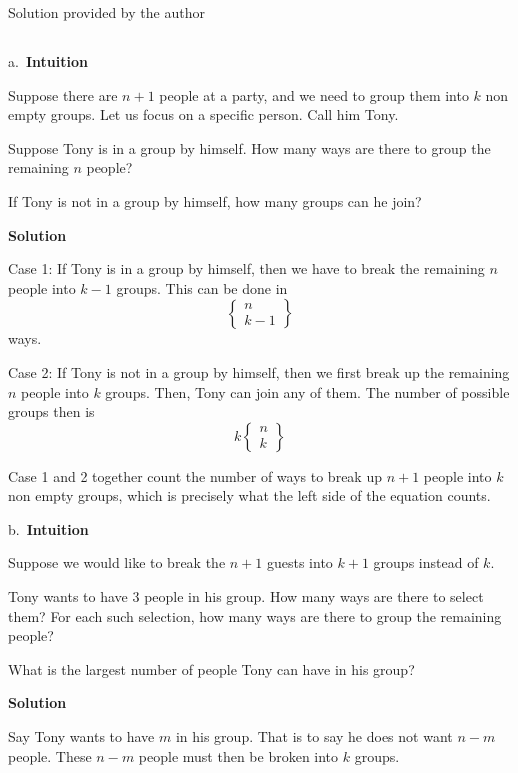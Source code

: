 \documentclass[]{book}
\begin{document}
Solution provided by the author

\subsection{}\label{section-20}

a.~\textbf{Intuition}

Suppose there are \(n+1\) people at a party, and we need to group them
into \(k\) non empty groups. Let us focus on a specific person. Call him
Tony.

Suppose Tony is in a group by himself. How many ways are there to group
the remaining \(n\) people?

If Tony is not in a group by himself, how many groups can he join?

 \textbf{Solution}

Case 1: If Tony is in a group by himself, then we have to break the
remaining \(n\) people into \(k-1\) groups. This can be done in \[
  \left\{
    \begin{array}{cc}
        n\\
        k-1
    \end{array}
  \right\}
  \] ways.

Case 2: If Tony is not in a group by himself, then we first break up the
remaining \(n\) people into \(k\) groups. Then, Tony can join any of
them. The number of possible groups then is \[
  k\left\{
    \begin{array}{cc}
        n\\
        k
    \end{array}
  \right\}
  \]

Case 1 and 2 together count the number of ways to break up \(n+1\)
people into \(k\) non empty groups, which is precisely what the left
side of the equation counts.

b.~\textbf{Intuition}

Suppose we would like to break the \(n+1\) guests into \(k+1\) groups
instead of \(k\).

Tony wants to have \(3\) people in his group. How many ways are there to
select them? For each such selection, how many ways are there to group
the remaining people?

What is the largest number of people Tony can have in his group?

 \textbf{Solution}

Say Tony wants to have \(m\) in his group. That is to say he does not
want \(n-m\) people. These \(n-m\) people must then be broken into \(k\)
groups.
\end{document}
